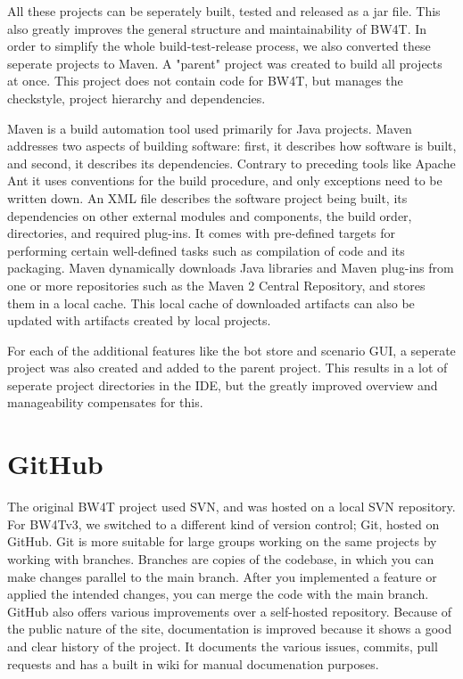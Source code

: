 All these projects can be seperately built, tested and released as a jar file. This also greatly improves the general structure and maintainability of BW4T. In order to simplify the whole build-test-release process, we also converted these seperate projects to Maven. A "parent" project was created to build all projects at once. This project does not contain code for BW4T, but manages the checkstyle, project hierarchy and dependencies. 

Maven is a build automation tool used primarily for Java projects. Maven addresses two aspects of building software: first, it describes how software is built, and second, it describes its dependencies. Contrary to preceding tools like Apache Ant it uses conventions for the build procedure, and only exceptions need to be written down. An XML file describes the software project being built, its dependencies on other external modules and components, the build order, directories, and required plug-ins. It comes with pre-defined targets for performing certain well-defined tasks such as compilation of code and its packaging. Maven dynamically downloads Java libraries and Maven plug-ins from one or more repositories such as the Maven 2 Central Repository, and stores them in a local cache. This local cache of downloaded artifacts can also be updated with artifacts created by local projects.

For each of the additional features like the bot store and scenario GUI, a seperate project was also created and added to the parent project. This results in a lot of seperate project directories in the IDE, but the greatly improved overview and manageability compensates for this. 

\section{GitHub}
The original BW4T project used SVN, and was hosted on a local SVN repository. For BW4Tv3, we switched to a different kind of version control; Git, hosted on GitHub. Git is more suitable for large groups working on the same projects by working with branches. Branches are copies of the codebase, in which you can make changes parallel to the main branch. After you implemented a feature or applied the intended changes, you can merge the code with the main branch. GitHub also offers various improvements over a self-hosted repository. Because of the public nature of the site, documentation is improved because it shows a good and clear history of the project. It documents the various issues, commits, pull requests and has a built in wiki for manual documenation purposes. 

